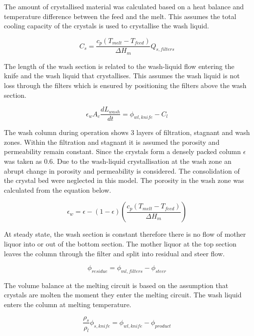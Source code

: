 The amount of crystallised material was calculated based on a heat balance and temperature difference between the feed and the melt. This assumes the total cooling capacity of the crystals is used to crystallise the wash liquid. 

\begin{equation}
C_s= \frac{c_p(T_{melt}-T_{feed})}{\Delta H_m}Q_{s,filters}
\end{equation}

The length of the wash section is related to the wash-liquid flow entering the knife and the wash liquid that crystallises. This assumes the wash liquid is not loss through the filters which is ensured by positioning the filters above the wash section.

\begin{equation}
\epsilon_w A_c \frac{dL_{wash}}{dt}= \phi_{wl,knife}-C_l
\end{equation}

The wash column during operation shows 3 layers of filtration, stagnant and wash zones. Within the filtration and stagnant it is assumed the porosity and permeability remain constant. Since the crystals form a densely packed column $\epsilon$ was taken as 0.6. Due to the wash-liquid crystallisation at the wash zone an abrupt change in porosity and permeability is considered. The consolidation of the crystal bed were neglected in this model. The porosity in the wash zone was calculated from the equation below. 

\begin{equation}
\epsilon_{w}= \epsilon-(1-\epsilon)\left(\frac{c_p(T_{melt}-T_{feed})}{\Delta H_m}\right)
\end{equation}

At steady state, the wash section is constant therefore there is no flow of mother liquor into or out of the bottom section. The mother liquor at the top section leaves the column through the filter and split into residual and steer flow. 

\begin{equation}
\phi_{residue}= \phi_{ml,filters} - \phi_{steer}
\end{equation}

The volume balance at the melting circuit is based on the assumption that crystals are molten the moment they enter the melting circuit. The wash liquid enters the column at melting temperature. 

\begin{equation}
\frac{\rho_s}{\rho_l}\phi_{s,knife}= \phi_{wl,knife} - \phi_{product}
\end{equation}


